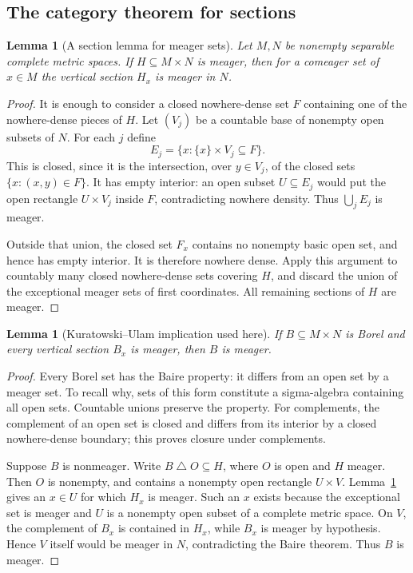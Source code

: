 \documentclass[11pt,a4paper]{article}
\newcommand{\sdelta}{\mathbin{\triangle}}
\newtheorem{lemma}[theorem]{Lemma}
\theoremstyle{definition}\newtheorem{definition}[theorem]{Definition}
\theoremstyle{remark}\newtheorem{remark}[theorem]{Remark}
\begin{document}
\subsection{The category theorem for sections}
\label{app:KU}
\begin{lemma}[A section lemma for meager sets]\label{lem:sections}
Let $M,N$ be nonempty separable complete metric spaces. If $H\subseteq M\times N$ is meager, then for a comeager set of $x\in M$ the vertical section $H_x$ is meager in $N$.
\end{lemma}
\begin{proof}
It is enough to consider a closed nowhere-dense set $F$ containing one of the nowhere-dense pieces of $H$. Let $(V_j)$ be a countable base of nonempty open subsets of $N$. For each $j$ define
\[
                    E_j=\{x:\{x\}\times V_j\subseteq F\}.
\]
This is closed, since it is the intersection, over $y\in V_j$, of the closed sets $\{x:(x,y)\in F\}$. It has empty interior: an open subset $U\subseteq E_j$ would put the open rectangle $U\times V_j$ inside $F$, contradicting nowhere density. Thus $\bigcup_jE_j$ is meager.

Outside that union, the closed set $F_x$ contains no nonempty basic open set, and hence has empty interior. It is therefore nowhere dense. Apply this argument to countably many closed nowhere-dense sets covering $H$, and discard the union of the exceptional meager sets of first coordinates. All remaining sections of $H$ are meager.
\end{proof}

\begin{lemma}[Kuratowski--Ulam implication used here]\label{lem:KU}
If $B\subseteq M\times N$ is Borel and every vertical section $B_x$ is meager, then $B$ is meager.
\end{lemma}
\begin{proof}
Every Borel set has the Baire property: it differs from an open set by a meager set. To recall why, sets of this form constitute a sigma-algebra containing all open sets. Countable unions preserve the property. For complements, the complement of an open set is closed and differs from its interior by a closed nowhere-dense boundary; this proves closure under complements.

Suppose $B$ is nonmeager. Write $B\sdelta O\subseteq H$, where $O$ is open and $H$ meager. Then $O$ is nonempty, and contains a nonempty open rectangle $U\times V$. Lemma~\ref{lem:sections} gives an $x\in U$ for which $H_x$ is meager. Such an $x$ exists because the exceptional set is meager and $U$ is a nonempty open subset of a complete metric space. On $V$, the complement of $B_x$ is contained in $H_x$, while $B_x$ is meager by hypothesis. Hence $V$ itself would be meager in $N$, contradicting the Baire theorem. Thus $B$ is meager.
\end{proof}
\end{document}
